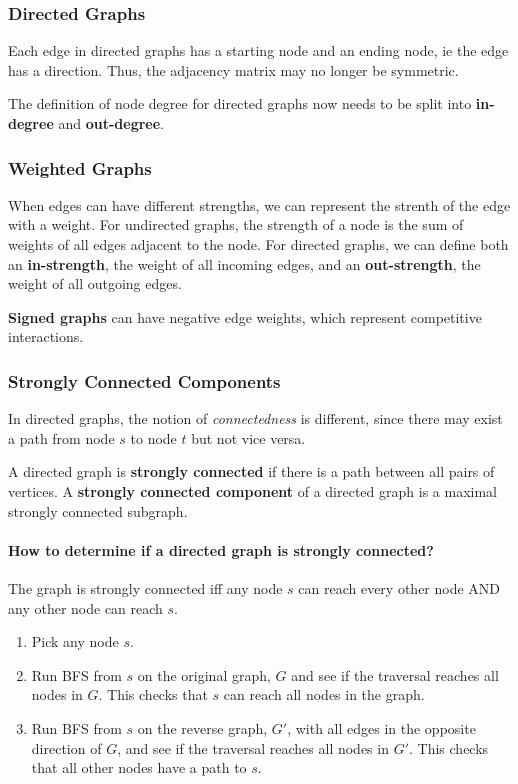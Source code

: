 \documentclass[11pt]{scrartcl} %
\begin{document}
\subsubsection{Directed Graphs}
Each edge in directed graphs has a starting node and an ending node, ie the edge has a direction. Thus, the adjacency matrix may no longer be symmetric.

The definition of node degree for directed graphs now needs to be split into \textbf{in-degree} and \textbf{out-degree}.

\subsubsection{Weighted Graphs}
When edges can have different strengths, we can represent the strenth of the edge with a weight. For undirected graphs, the strength of a node is the sum of weights of all edges adjacent to the node. For directed graphs, we can define both an \textbf{in-strength}, the weight of all incoming edges, and an  \textbf{out-strength}, the weight of all outgoing edges.

 \textbf{Signed graphs} can have negative edge weights, which represent competitive interactions.

\subsubsection{Strongly Connected Components}
In directed graphs, the notion of \emph{connectedness} is different, since there may exist a path from node $s$ to node $t$ but not vice versa. 

A directed graph is \textbf{strongly connected} if there is a path between all pairs of vertices. A \textbf{strongly connected component} of a directed graph is a maximal strongly connected subgraph. 

\paragraph{How to determine if a directed graph is strongly connected?} 
The graph is strongly connected iff any node $s$ can reach every other node AND any other node can reach $s$. 
\begin{enumerate}
	\item Pick any node $s$.
	\item Run BFS from $s$ on the original graph, $G$ and see if the traversal reaches all nodes in $G$. This checks that $s$ can reach all nodes in the graph.
	\item Run BFS from $s$ on the reverse graph, $G'$, with all edges in the opposite direction of $G$, and see if the traversal reaches all nodes in $G'$. This checks that all other nodes have a path to $s$.
\end{enumerate}
\end{document}
